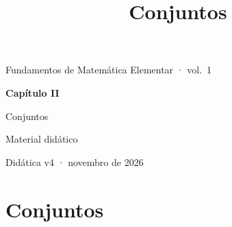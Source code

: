 \documentclass[11pt,twoside,openany]{book}
\title{Conjuntos}
\begin{document}
\frontmatter
\begin{titlepage}
  \centering\sffamily
  \vspace*{5cm}
  {\color{cinza}\large Fundamentos de Matemática Elementar · vol.~1\par}
  \vspace{1.2em}
  {\color{acento}\Huge\bfseries Capítulo II\par\vspace{0.3em}Conjuntos\par}
  \vspace{2em}
  {\large Material didático\par}
  \vfill
  {\small\color{cinza}Didática v4 · novembro de 2026\par}
\end{titlepage}
\tableofcontents

\mainmatter
\setcounter{chapter}{1}
\chapter{Conjuntos}







\clearpage


\backmatter

\end{document}
